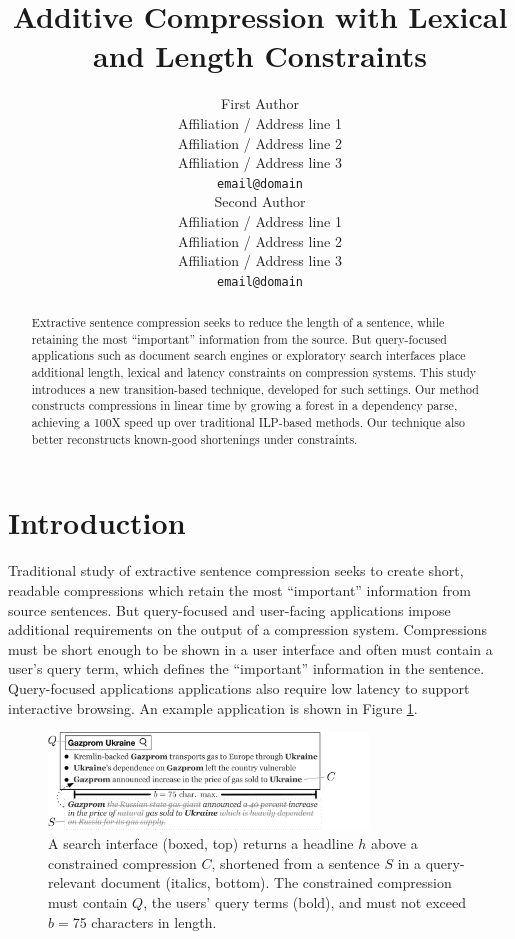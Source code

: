 \documentclass[11pt,a4paper]{article}
\title{Additive Compression with Lexical and Length Constraints}
\author{First Author \\
  Affiliation / Address line 1 \\
  Affiliation / Address line 2 \\
  Affiliation / Address line 3 \\
  {\tt email@domain} \\\And
  Second Author \\
  Affiliation / Address line 1 \\
  Affiliation / Address line 2 \\
  Affiliation / Address line 3 \\
  {\tt email@domain} \\}
\date{}
\begin{document}
\maketitle

\begin{abstract}
Extractive sentence compression seeks to reduce the length of a sentence, while retaining the most ``important'' information from the source. But query-focused applications such as document search engines or exploratory search interfaces place additional length, lexical and latency constraints on compression systems. This study introduces a new transition-based technique, developed for such settings. Our method constructs compressions in linear time by growing a forest in a dependency parse, achieving a 100X speed up over traditional ILP-based methods. Our technique also better reconstructs known-good shortenings under constraints.
\end{abstract}

\section{Introduction}\label{s:intro}

Traditional study of extractive sentence compression seeks to create short, readable compressions which retain the most ``important'' information from source sentences. But query-focused and user-facing applications impose additional requirements on the output of a compression system. Compressions must be short enough to be shown in a user interface and often must contain a user's query term, which defines the ``important'' information in the sentence. Query-focused applications applications also require low latency to support interactive browsing. An example application is shown in Figure \ref{f:qf}.

\begin{figure}[htb!]
\includegraphics[width=8.5cm]{qf.pdf}
\caption{A search interface (boxed, top) returns a headline $h$ above a constrained compression $C$, shortened from a sentence $S$ in a query-relevant document (italics, bottom). The constrained compression must contain $Q$, the users' query terms (bold), and must not exceed $b=$75 characters in length.}
\label{f:qf}
\end{figure}
\end{document}
